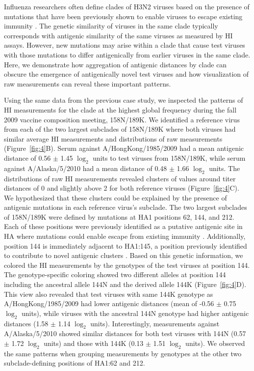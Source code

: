 \documentclass[utf8]{FrontiersinHarvard} %
\begin{document}
Influenza researchers often define clades of H3N2 viruses based on the presence of mutations that have been previously shown to enable viruses to escape existing immunity \citep{Wolf:2006da,Shih:2007bd,Koel:2013jz}.
The genetic similarity of viruses in the same clade typically corresponds with antigenic similarity of the same viruses as measured by HI assays.
However, new mutations may arise within a clade that cause test viruses with those mutations to differ antigenically from earlier viruses in the same clade.
Here, we demonstrate how aggregation of antigenic distances by clade can obscure the emergence of antigenically novel test viruses and how visualization of raw measurements can reveal these important patterns.

Using the same data from the previous case study, we inspected the patterns of HI measurements for the clade at the highest global frequency during the fall 2009 vaccine composition meeting, 158N/189K.
We identified a reference virus from each of the two largest subclades of 158N/189K where both viruses had similar average HI measurements and distributions of raw measurements (Figure~\ref{fig:4}B).
Serum against A/HongKong/1985/2009 had a mean antigenic distance of 0.56 $\pm$ 1.45 $\log_{2}$ units to test viruses from 158N/189K, while serum against A/Alaska/5/2010 had a mean distance of 0.48 $\pm$ 1.66 $\log_{2}$ units.
The distributions of raw HI measurements revealed clusters of values around titer distances of 0 and slightly above 2 for both reference viruses (Figure~\ref{fig:4}C).
We hypothesized that these clusters could be explained by the presence of antigenic mutations in each reference virus's subclade.
The two largest subclades of 158N/189K were defined by mutations at HA1 positions 62, 144, and 212.
Each of these positions were previously identified as a putative antigenic site in HA where mutations could enable escape from existing immunity \citep{Wolf:2006da}.
Additionally, position 144 is immediately adjacent to HA1:145, a position previously identified to contribute to novel antigenic clusters \citep{Koel:2013jz}.
Based on this genetic information, we colored the HI measurements by the genotypes of the test viruses at position 144.
The genotype-specific coloring showed two different alleles at position 144 including the ancestral allele 144N and the derived allele 144K (Figure~\ref{fig:4}D).
This view also revealed that test viruses with same 144K genotype as A/HongKong/1985/2009 had lower antigenic distances (mean of -0.56 $\pm$ 0.75 $\log_{2}$ units), while viruses with the ancestral 144N genotype had higher antigenic distances (1.58 $\pm$ 1.14 $\log_{2}$ units).
Interestingly, measurements against A/Alaska/5/2010 showed similar distances for both test viruses with 144N (0.57 $\pm$ 1.72 $\log_{2}$ units) and those with 144K (0.13 $\pm$ 1.51 $\log_{2}$ units).
We observed the same patterns when grouping measurements by genotypes at the other two subclade-defining positions of HA1:62 and 212.
\end{document}
